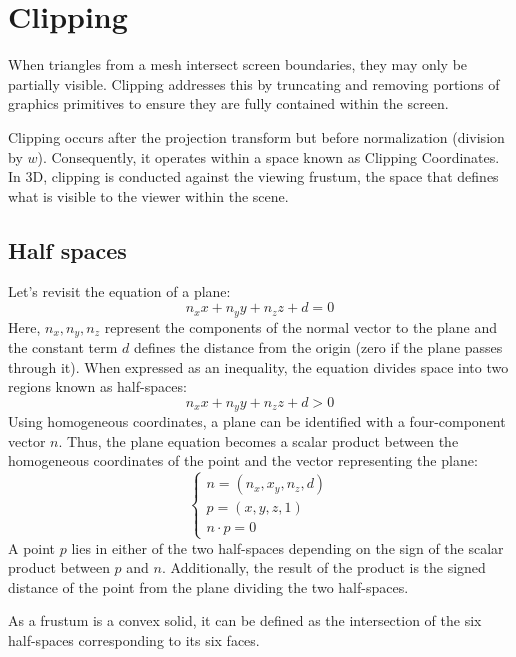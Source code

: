 \section{Clipping}

When triangles from a mesh intersect screen boundaries, they may only be partially visible. 
Clipping addresses this by truncating and removing portions of graphics primitives to ensure they are fully contained within the screen.

Clipping occurs after the projection transform but before normalization (division by $w$). 
Consequently, it operates within a space known as Clipping Coordinates.
In 3D, clipping is conducted against the viewing frustum, the space that defines what is visible to the viewer within the scene.

\subsection{Half spaces}
Let's revisit the equation of a plane:
\[n_x x+n_y y+n_z z+d=0\]
Here, $n_x, n_y,n_z$ represent the components of the normal vector to the plane and the constant term $d$ defines the distance from the origin (zero if the plane passes through it).
When expressed as an inequality, the equation divides space into two regions known as half-spaces:
\[n_x x+n_y y+n_z z+d>0\]
Using homogeneous coordinates, a plane can be identified with a four-component vector $n$. 
Thus, the plane equation becomes a scalar product between the homogeneous coordinates of the point and the vector representing the plane:
\[\begin{cases}
    n=\left(n_x,x_y,n_z,d\right) \\
    p=\left(x,y,z,1\right) \\
    n \cdot p = 0
\end{cases}\]
A point $p$ lies in either of the two half-spaces depending on the sign of the scalar product between $p$ and $n$. 
Additionally, the result of the product is the signed distance of the point from the plane dividing the two half-spaces.

As a frustum is a convex solid, it can be defined as the intersection of the six half-spaces corresponding to its six faces.

